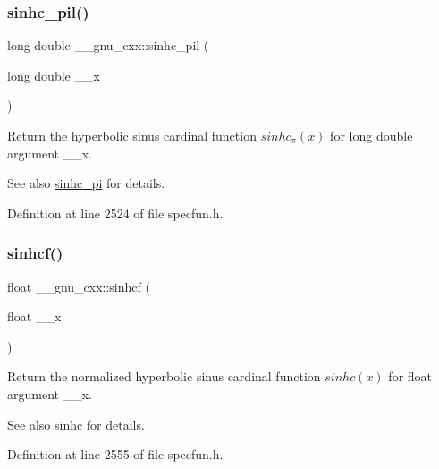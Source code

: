\subsubsection{\texorpdfstring{sinhc\+\_\+pil()}{sinhc\_pil()}}
{\footnotesize\ttfamily long double \+\_\+\+\_\+gnu\+\_\+cxx\+::sinhc\+\_\+pil (\begin{DoxyParamCaption}\item[{long double}]{\+\_\+\+\_\+x }\end{DoxyParamCaption})\hspace{0.3cm}{\ttfamily [inline]}}

Return the hyperbolic sinus cardinal function $ sinhc_\pi(x) $ for {\ttfamily long double} argument {\ttfamily \+\_\+\+\_\+x}.

\begin{DoxySeeAlso}{See also}
\hyperlink{group__mathsf__gnu_ga8bb6034e28d48879845bf64818cc06e1}{sinhc\+\_\+pi} for details. 
\end{DoxySeeAlso}


Definition at line 2524 of file specfun.\+h.

\mbox{\label{group__mathsf__gnu_gadaa7ea78625cc2eeb70213a50719813d}} 
\subsubsection{\texorpdfstring{sinhcf()}{sinhcf()}}
{\footnotesize\ttfamily float \+\_\+\+\_\+gnu\+\_\+cxx\+::sinhcf (\begin{DoxyParamCaption}\item[{float}]{\+\_\+\+\_\+x }\end{DoxyParamCaption})\hspace{0.3cm}{\ttfamily [inline]}}

Return the normalized hyperbolic sinus cardinal function $ sinhc(x) $ for {\ttfamily float} argument {\ttfamily \+\_\+\+\_\+x}.

\begin{DoxySeeAlso}{See also}
\hyperlink{group__mathsf__gnu_gaf2f02e4143e7beb97352cef4b7fcb663}{sinhc} for details. 
\end{DoxySeeAlso}


Definition at line 2555 of file specfun.\+h.

